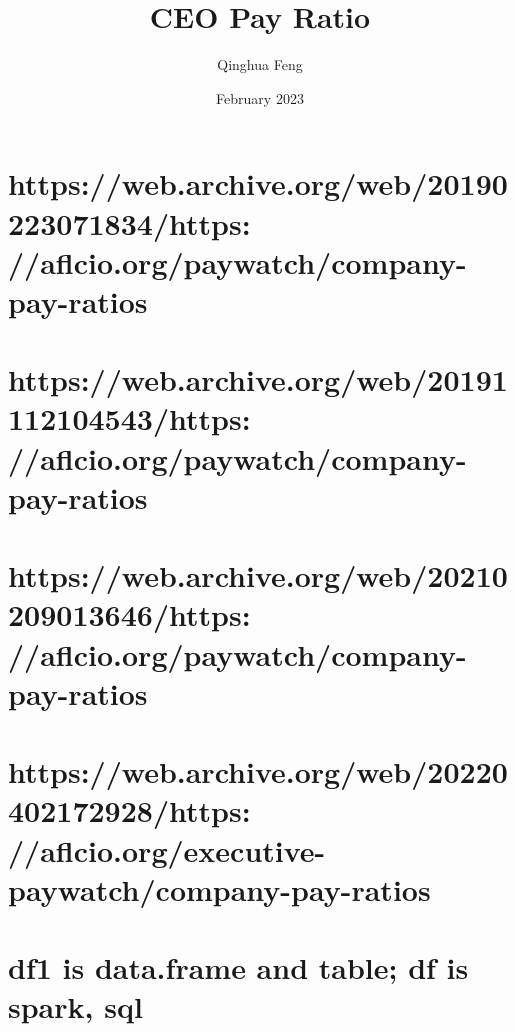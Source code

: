 \documentclass{article}
\title{CEO Pay Ratio}
\author{Qinghua Feng }
\date{February 2023}
\begin{document}
\maketitle

\section{https://web.archive.org/web/20190223071834/https:
//aflcio.org/paywatch/company-pay-ratios}
\section{https://web.archive.org/web/20191112104543/https:
//aflcio.org/paywatch/company-pay-ratios}
\section{https://web.archive.org/web/20210209013646/https:
//aflcio.org/paywatch/company-pay-ratios}
\section{https://web.archive.org/web/20220402172928/https:
//aflcio.org/executive-paywatch/company-pay-ratios}


\section{df1 is data.frame and table; df is spark, sql}
\end{document}
